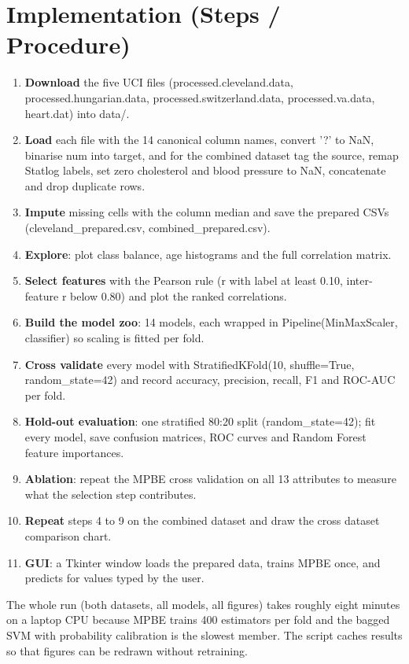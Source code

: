 \documentclass[12pt,a4paper,oneside]{report}
\begin{document}
\chapter{Implementation (Steps / Procedure)}
\begin{enumerate}
  \item \textbf{Download} the five UCI files (processed.cleveland.data, processed.hungarian.data, processed.switzerland.data, processed.va.data, heart.dat) into data/.
  \item \textbf{Load} each file with the 14 canonical column names, convert '?' to NaN, binarise num into target, and for the combined dataset tag the source, remap Statlog labels, set zero cholesterol and blood pressure to NaN, concatenate and drop duplicate rows.
  \item \textbf{Impute} missing cells with the column median and save the prepared CSVs (cleveland\_prepared.csv, combined\_prepared.csv).
  \item \textbf{Explore}: plot class balance, age histograms and the full correlation matrix.
  \item \textbf{Select features} with the Pearson rule (\textbar{}r\textbar{} with label at least 0.10, inter-feature \textbar{}r\textbar{} below 0.80) and plot the ranked correlations.
  \item \textbf{Build the model zoo}: 14 models, each wrapped in Pipeline(MinMaxScaler, classifier) so scaling is fitted per fold.
  \item \textbf{Cross validate} every model with StratifiedKFold(10, shuffle=True, random\_state=42) and record accuracy, precision, recall, F1 and ROC-AUC per fold.
  \item \textbf{Hold-out evaluation}: one stratified 80:20 split (random\_state=42); fit every model, save confusion matrices, ROC curves and Random Forest feature importances.
  \item \textbf{Ablation}: repeat the MPBE cross validation on all 13 attributes to measure what the selection step contributes.
  \item \textbf{Repeat} steps 4 to 9 on the combined dataset and draw the cross dataset comparison chart.
  \item \textbf{GUI}: a Tkinter window loads the prepared data, trains MPBE once, and predicts for values typed by the user.
\end{enumerate}

The whole run (both datasets, all models, all figures) takes roughly eight minutes on a laptop CPU because MPBE trains 400 estimators per fold and the bagged SVM with probability calibration is the slowest member. The script caches results so that figures can be redrawn without retraining.
\end{document}
